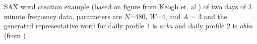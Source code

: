 SAX word creation example (based on figure from Keogh et. al \cite{keogh_hot_2005}) of two days of 3 minute frequency data, parameters are $N$=480, $W$=4, and $A$ = 3 and the generated representative word for daily profile 1 is \emph{acba} and daily profile 2 is \emph{abba} (from \cite{miller_automated_2015})
\label{fig:SAXWord}